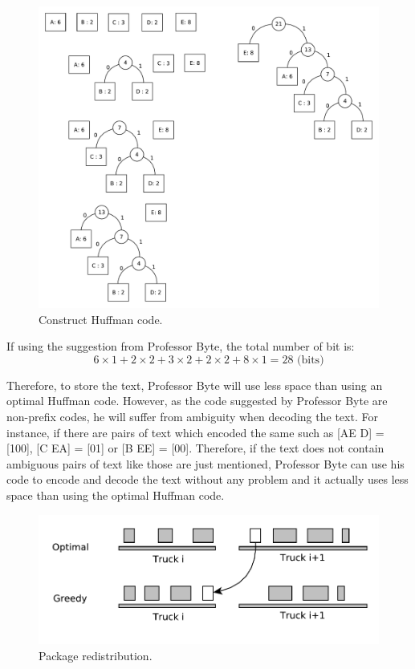 \documentclass[11pts]{report}
\begin{document}
\begin{enumerate}
\begin{figure}[htbp]
\begin{center}
\includegraphics[scale=0.32]{4.pdf}
\caption{Construct Huffman code.}
\label{Fig:4}
\end{center}
\end{figure}

If using the suggestion from Professor Byte, the total number of bit is:
\begin{equation*}
6 \times 1 + 2 \times 2 + 3 \times 2 + 2 \times 2 + 8 \times 1 = 28 \text{ (bits)}
\end{equation*}

Therefore, to store the text, Professor Byte will use less space than using an optimal Huffman code. However, as the code suggested by Professor Byte are non-prefix codes, he will suffer from ambiguity when decoding the text. For instance, if there are pairs of text which encoded the same such as [AE D] = [100], [C EA] = [01] or [B EE] = [00]. Therefore, if the text does not contain ambiguous pairs of text like those are just mentioned, Professor Byte can use his code to encode and decode the text without any problem and it actually uses less space than using the optimal Huffman code.

\begin{figure}[htbp]
\begin{center}
\includegraphics[scale=0.7]{5.pdf}
\caption{Package redistribution.}
\label{Fig:5}
\end{center}
\end{figure}


\end{enumerate}
\end{document}
